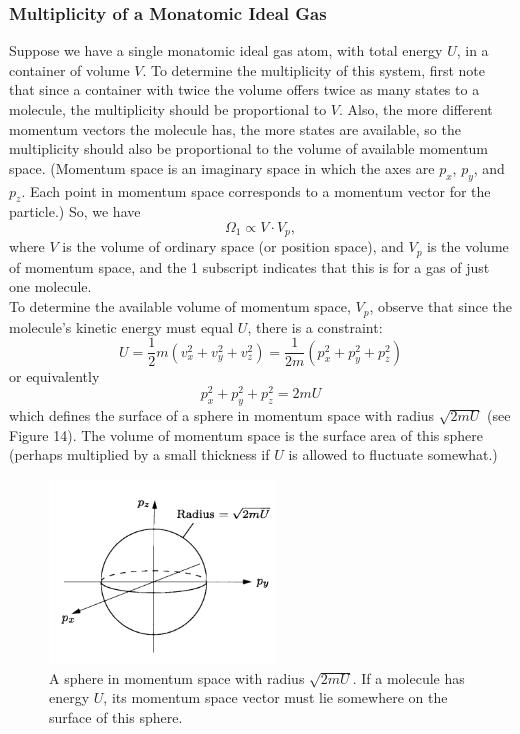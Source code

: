 \documentclass[11pt]{exam}
\begin{document}
\subsubsection*{Multiplicity of a Monatomic Ideal Gas}
Suppose we have a single monatomic ideal gas atom, with total energy $U$, in a container of volume $V$. To determine the multiplicity of this system, first note that since a container with twice the volume offers twice as many states to a molecule, the multiplicity should be proportional to $V$. Also, the more different momentum vectors the molecule has, the more states are available, so the multiplicity should also be proportional to the volume of available momentum space. (Momentum space is an imaginary space in which the axes are $p_x$, $p_y$, and $p_z$. Each point in momentum space corresponds to a momentum vector for the particle.) So, we have 
\begin{equation}\tag{2.29}
\Omega_1 \propto V\cdot V_p, 
\end{equation}
where $V$ is the volume of ordinary space (or position space), and $V_p$ is the volume of momentum space, and the 1 subscript indicates that this is for a gas of just one molecule.\\
\hspace*{10mm}To determine the available volume of momentum space, $V_p$, observe that since the molecule's kinetic energy must equal $U$, there is a constraint:
\begin{equation}\tag{2.30}
U=\frac{1}{2}m(v_x^2+v_y^2+v_z^2)=\frac{1}{2m}(p_x^2+p_y^2+p_z^2)    
\end{equation}
or equivalently 
\begin{equation}\tag{2.31}
p_x^2+p_y^2+p_z^2 = 2mU    
\end{equation}
which defines the surface of a sphere in momentum space with radius $\sqrt{2mU}$ (see Figure 14). The volume of momentum space is the surface area of this sphere (perhaps multiplied by a small thickness if $U$ is allowed to fluctuate somewhat.)
\begin{figure}[htp]
    \centering
    \includegraphics[width=6cm]{figure14.png}
    \caption{A sphere in momentum space with radius $\sqrt{2mU}$. If a molecule has energy $U$, its momentum space vector must lie somewhere on the surface of this sphere.}
\label{fig:momentum-space-volume}
\end{figure}\\
\end{document}
